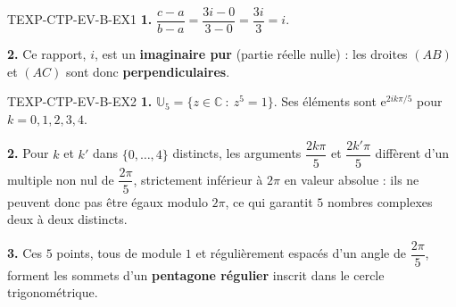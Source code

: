 %
\begin{corrige}{TEXP-CTP-EV-B-EX1}
\textbf{1.} $\dfrac{c-a}{b-a} = \dfrac{3i-0}{3-0} = \dfrac{3i}{3} = i$.

\textbf{2.} Ce rapport, $i$, est un \textbf{imaginaire pur} (partie réelle nulle) : les droites $(AB)$ et $(AC)$ sont donc \textbf{perpendiculaires}.
\end{corrige}

\begin{corrige}{TEXP-CTP-EV-B-EX2}
\textbf{1.} $\mathbb{U}_5 = \{z\in\mathbb{C}\ :\ z^5=1\}$. Ses éléments sont $\mathrm{e}^{2ik\pi/5}$ pour $k=0,1,2,3,4$.

\textbf{2.} Pour $k$ et $k'$ dans $\{0,\dots,4\}$ distincts, les arguments $\dfrac{2k\pi}{5}$ et $\dfrac{2k'\pi}{5}$ diffèrent d'un multiple non nul de $\dfrac{2\pi}{5}$, strictement inférieur à $2\pi$ en valeur absolue : ils ne peuvent donc pas être égaux modulo $2\pi$, ce qui garantit $5$ nombres complexes deux à deux distincts.

\textbf{3.} Ces $5$ points, tous de module $1$ et régulièrement espacés d'un angle de $\dfrac{2\pi}{5}$, forment les sommets d'un \textbf{pentagone régulier} inscrit dans le cercle trigonométrique.
\end{corrige}

